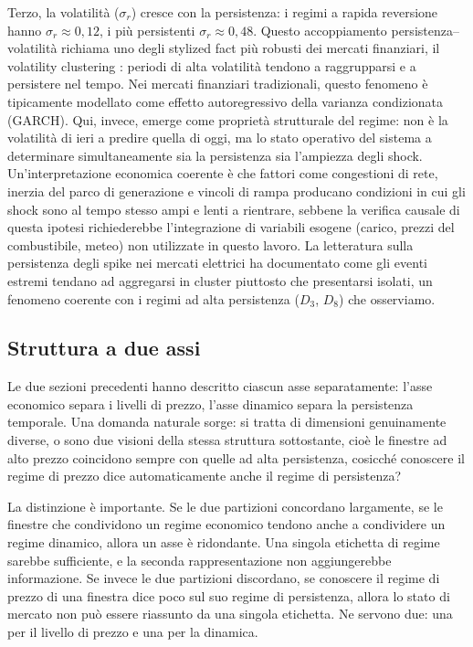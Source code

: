 \documentclass[12pt]{article}
\begin{document}
Terzo, la volatilità ($\sigma_r$) cresce con la persistenza: i regimi a rapida reversione hanno $\sigma_r \approx 0{,}12$, i più persistenti $\sigma_r \approx 0{,}48$.
Questo accoppiamento persistenza--volatilità richiama uno degli stylized fact più robusti dei mercati finanziari, il volatility clustering \citep{cont2001}: periodi di alta volatilità tendono a raggrupparsi e a persistere nel tempo.
Nei mercati finanziari tradizionali, questo fenomeno è tipicamente modellato come effetto autoregressivo della varianza condizionata (GARCH).
Qui, invece, emerge come proprietà strutturale del regime: non è la volatilità di ieri a predire quella di oggi, ma lo stato operativo del sistema a determinare simultaneamente sia la persistenza sia l'ampiezza degli shock.
Un'interpretazione economica coerente è che fattori come congestioni di rete, inerzia del parco di generazione e vincoli di rampa producano condizioni in cui gli shock sono al tempo stesso ampi e lenti a rientrare, sebbene la verifica causale di questa ipotesi richiederebbe l'integrazione di variabili esogene (carico, prezzi del combustibile, meteo) non utilizzate in questo lavoro.
La letteratura sulla persistenza degli spike nei mercati elettrici \citep{christensen2009} ha documentato come gli eventi estremi tendano ad aggregarsi in cluster piuttosto che presentarsi isolati, un fenomeno coerente con i regimi ad alta persistenza ($D_3$, $D_8$) che osserviamo.


\subsection{Struttura a due assi}
\label{sec:two_axes}

Le due sezioni precedenti hanno descritto ciascun asse separatamente: l'asse economico separa i livelli di prezzo, l'asse dinamico separa la persistenza temporale.
Una domanda naturale sorge: si tratta di dimensioni genuinamente diverse, o sono due visioni della stessa struttura sottostante, cioè le finestre ad alto prezzo coincidono sempre con quelle ad alta persistenza, cosicché conoscere il regime di prezzo dice automaticamente anche il regime di persistenza?

La distinzione è importante.
Se le due partizioni concordano largamente, se le finestre che condividono un regime economico tendono anche a condividere un regime dinamico, allora un asse è ridondante.
Una singola etichetta di regime sarebbe sufficiente, e la seconda rappresentazione non aggiungerebbe informazione.
Se invece le due partizioni discordano, se conoscere il regime di prezzo di una finestra dice poco sul suo regime di persistenza, allora lo stato di mercato non può essere riassunto da una singola etichetta.
Ne servono due: una per il livello di prezzo e una per la dinamica.
\end{document}
